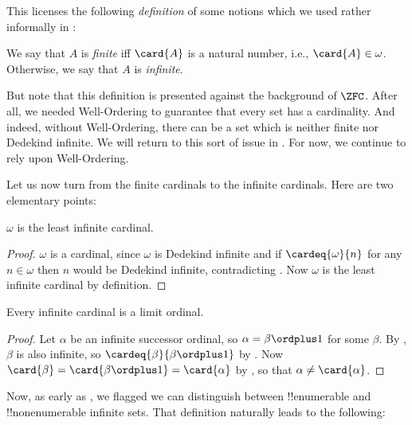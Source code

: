 \documentclass[../../../include/open-logic-section]{subfiles}
\begin{document}
This licenses the following \emph{definition} of some notions which we
used rather informally in :

\begin{defn}
We say that $A$ is \emph{finite} iff $\card{A}$ is a natural number,
i.e., $\card{A} \in \omega$. Otherwise, we say that $A$ is
\emph{infinite}.
\end{defn}
\noindent 
But note that this definition is presented against the background of
$\ZFC$. After all, we needed Well-Ordering to guarantee that every set
has a cardinality. And indeed, without Well-Ordering, there can be a
set which is neither finite nor Dedekind infinite. We will return to
this sort of issue in . For now, we continue to
rely upon Well-Ordering.

Let us now turn from the finite cardinals to the infinite cardinals.
Here are two elementary points:

\begin{cor}
$\omega$ is the least infinite cardinal. 
\end{cor}

\begin{proof}
$\omega$ is a cardinal, since $\omega$ is Dedekind infinite and if
$\cardeq{\omega}{n}$ for any $n \in \omega$ then $n$ would be Dedekind
infinite, contradicting
. Now
$\omega$ is the least infinite cardinal by definition. 
\end{proof}

\begin{cor}
Every infinite cardinal is a limit ordinal.
\end{cor}

\begin{proof}
Let $\alpha$ be an infinite successor ordinal, so $\alpha = \beta
\ordplus 1$ for some $\beta$. By , $\beta$
is also infinite, so $\cardeq{\beta}{\beta \ordplus 1}$ by
. Now
$\card{\beta} = \card{\beta\ordplus 1} = \card{\alpha}$ by
, so
that $\alpha \neq \card{\alpha}$.
\end{proof}

Now, as early as , we flagged we
can distinguish between !!{enumerable} and !!{nonenumerable} infinite
sets. That definition naturally leads to the following:
\end{document}
